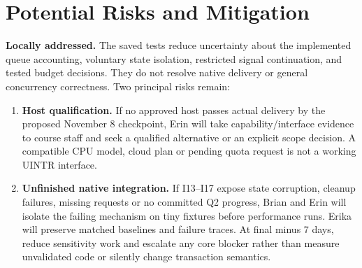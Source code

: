 \documentclass[sigconf,nonacm]{acmart}
\newcommand{\minihead}[1]{{\vspace{.45em}\noindent\textbf{#1.} }}
\begin{document}
\section{Potential Risks and Mitigation}
\minihead{Locally addressed}
The saved tests reduce uncertainty about the implemented queue accounting,
voluntary state isolation, restricted signal continuation, and tested budget
decisions. They do not resolve native delivery or general concurrency correctness.
Two principal risks remain:
\begin{enumerate}\itemsep2pt
\item \textbf{Host qualification.} If no approved host passes actual delivery
by the proposed November 8 checkpoint, Erin will take capability/interface
evidence to course staff and seek a qualified alternative or an explicit scope
decision. A compatible CPU model, cloud plan or pending quota request is not
a working UINTR interface.
\item \textbf{Unfinished native integration.} If I13--I17 expose state corruption,
cleanup failures, missing requests or no committed Q2 progress, Brian and Erin
will isolate the failing mechanism on tiny fixtures before performance runs.
Erika will preserve matched baselines and failure traces. At final minus 7 days,
reduce sensitivity work and escalate any core blocker rather than measure
unvalidated code or silently change transaction semantics.
\end{enumerate}



\end{document}

